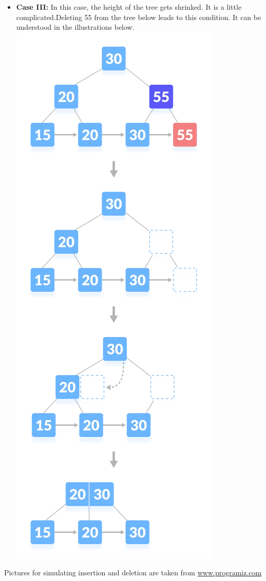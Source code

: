 \documentclass{article}
\begin{document}
    \newpage
    \begin{itemize}
            \item \textbf{Case III:} In this case, the height of the tree gets shrinked. It is a little complicated.Deleting 55 from the tree below leads to this condition. It can be understood in the illustrations below.
            \centering \includegraphics[scale = 0.4]{Images/deletion-6.png}
    \end{itemize}
    Pictures for simulating insertion and deletion are taken from \href{https://www.programiz.com/dsa/}{www.programiz.com}
\end{document}
